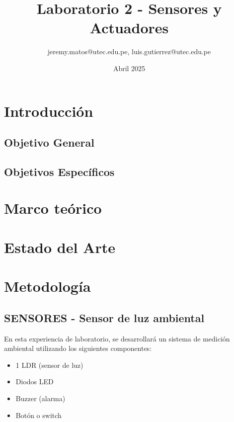 \documentclass{article}
\title{Laboratorio 2 - Sensores y Actuadores}
\author{jeremy.matos@utec.edu.pe, luis.gutierrez@utec.edu.pe}
\date{Abril 2025}
\begin{document}
\maketitle

\newpage
\tableofcontents
\newpage

\section{Introducción}

\subsection{Objetivo General}

\subsection{Objetivos Específicos}

\newpage

\section{Marco teórico}

\section{Estado del Arte}





\section{Metodología}

\subsection{SENSORES - Sensor de luz ambiental}

En esta experiencia de laboratorio, se desarrollará un sistema de medición ambiental utilizando los siguientes componentes: 
\begin{itemize}
    \item 1 LDR (sensor de luz)
    \item Diodos LED
    \item Buzzer (alarma)
    \item Botón o switch
\end{itemize}
\end{document}
